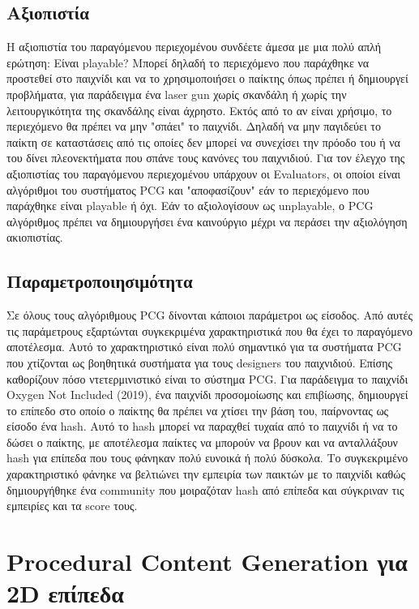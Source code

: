 \subsection{Aξιοπιστία} H αξιοπιστία του παραγόμενου περιεχομένου συνδέετε άμεσα με μια πολύ απλή ερώτηση: Είναι playable? Μπορεί δηλαδή το περιεχόμενο που παράχθηκε να προστεθεί στο παιχνίδι και να το χρησιμοποιήσει ο παίκτης όπως πρέπει ή δημιουργεί προβλήματα, για παράδειγμα ένα laser gun χωρίς σκανδάλη ή χωρίς την λειτουργικότητα της σκανδάλης είναι άχρηστο. Εκτός από το αν είναι χρήσιμο, το περιεχόμενο θα πρέπει να μην "σπάει" το παιχνίδι. Δηλαδή να μην παγιδεύει το παίκτη σε καταστάσεις από τις οποίες δεν μπορεί να συνεχίσει την πρόοδο του ή να του δίνει πλεονεκτήματα που σπάνε τους κανόνες του παιχνιδιού. Για τον έλεγχο της αξιοπιστίας του παραγόμενου περιεχομένου υπάρχουν οι Evaluators, οι οποίοι είναι αλγόριθμοι του συστήματος PCG και "αποφασίζουν" εάν το περιεχόμενο που παράχθηκε είναι playable ή όχι. Εάν το αξιολογίσουν ως unplayable, ο PCG αλγόριθμος πρέπει να δημιουργήσει ένα καινούργιο μέχρι να περάσει την αξιολόγηση ακιοπιστίας.

\subsection{Παραμετροποιησιμότητα} Σε όλους τους αλγόριθμους PCG δίνονται κάποιοι παράμετροι ως είσοδος. Από αυτές τις παράμετρους εξαρτώνται συγκεκριμένα χαρακτηριστικά που θα έχει το παραγόμενο αποτέλεσμα. Αυτό το χαρακτηριστικό είναι πολύ σημαντικό για τα συστήματα PCG που χτίζονται ως βοηθητικά συστήματα για τους designers του παιχνιδιού. Επίσης καθορίζουν πόσο ντετερμινιστικό είναι το σύστημα PCG. Για παράδειγμα το παιχνίδι Oxygen Not Included (2019), ένα παιχνίδι προσομοίωσης και επιβίωσης, δημιουργεί το επίπεδο στο οποίο ο παίκτης θα πρέπει να χτίσει την βάση του, παίρνοντας ως είσοδο ένα hash. Αυτό το hash μπορεί να παραχθεί τυχαία από το παιχνίδι ή να το δώσει ο παίκτης, με αποτέλεσμα παίκτες να μπορούν να βρουν και να ανταλλάξουν hash για επίπεδα που τους φάνηκαν πολύ ευνοικά ή πολύ δύσκολα. Το συγκεκριμένο χαρακτηριστικό φάνηκε να βελτιώνει την εμπειρία των παικτών με το παιχνίδι καθώς δημιουργήθηκε ένα community που μοιραζόταν hash από επίπεδα και σύγκριναν τις εμπειρίες και τα score τους.

\vspace{60mm}

\section{Procedural Content Generation για 2D επίπεδα}

